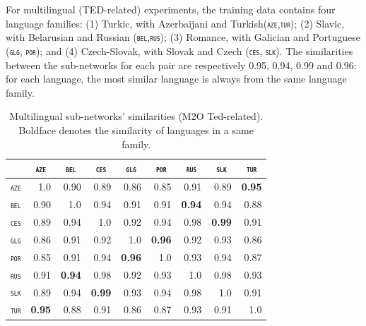 \documentclass[11pt]{article}
\newcommand{\domain}[1]{\texttt{\textsc{#1}}}
\newcommand{\SB}[1]{\textbf{#1}}
\begin{document}
For multilingual (TED-related) experiments, the training data contains four language families: (1) Turkic, with Azerbaijani and Turkish(\domain{aze},\domain{tur}); (2) Slavic, with Belarusian and Russian (\domain{bel},\domain{rus}); (3) Romance, with Galician and Portuguese (\domain{glg}, \domain{por}); and (4) Czech-Slovak, with Slovak and Czech (\domain{ces}, \domain{slk}). The similarities between the sub-networks for each pair are respectively 0.95, 0.94, 0.99 and 0.96: for each language, the most similar language is always from the same language family. 
\begin{table}[h!]
  \centering
  \begin{tabular}{|p{1cm}|*{8}{r|}} \hline
    & \multicolumn{1}{c|}{\domain{aze}} & \multicolumn{1}{c|}{\domain{bel}}& \multicolumn{1}{c|}{\domain{ces}} & \multicolumn{1}{c|}{\domain{glg}} & \multicolumn{1}{c|}{\domain{por}} & \multicolumn{1}{c|}{\domain{rus}} &\multicolumn{1}{c|}{\domain{slk}}&\multicolumn{1}{c|}{\domain{tur}} \\ \hline 
    \domain{aze} &1.0&0.90&0.89&0.86&0.85&0.91&0.89&\SB{0.95}\\
    \domain{bel} &0.90&1.0&0.94&0.91&0.91&\SB{0.94}&0.94&0.88\\
    \domain{ces} &0.89&0.94&1.0&0.92&0.94&0.98&\SB{0.99}&0.91\\
    \domain{glg} &0.86&0.91&0.92&1.0&\SB{0.96}&0.92&0.93&0.86\\ 
    \domain{por} &0.85&0.91&0.94&\SB{0.96}&1.0&0.93&0.94&0.87\\ 
    \domain{rus} &0.91&\SB{0.94}&0.98&0.92&0.93&1.0&0.98&0.93\\
    \domain{slk} &0.89&0.94&\SB{0.99}&0.93&0.94&0.98&1.0&0.91\\
    \domain{tur} &\SB{0.95}&0.88&0.91&0.86&0.87&0.93&0.91&1.0\\
    \hline
  \end{tabular}
  \caption{Multilingual sub-networks' similarities (M2O Ted-related). Boldface denotes the similarity of languages in a same family.}
  \label{tab:related-sim}
\end{table}
\end{document}
